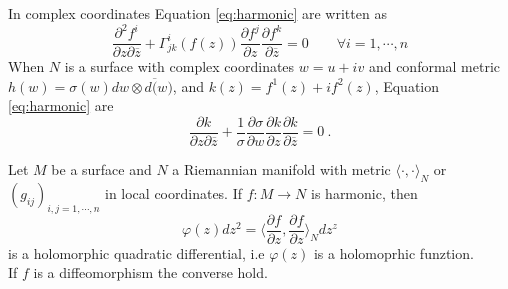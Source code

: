 In complex coordinates Equation \ref{eq:harmonic} are written as
\[
\frac{\partial^2 f^i}{\partial z \partial \overline{z}} + \Gamma^i_{jk} (f(z)) \frac{\partial f^j}{\partial z} \frac{\partial f^k}{\partial \overline{z}} = 0 \qquad \forall i = 1, \cdots, n
\]
When $N$ is a surface with complex coordinates $w = u + iv$ and conformal metric $h(w) = \sigma(w) dw \otimes d\overline(w)$, and $k(z) = f^1(z) + if^2(z)$, Equation \ref{eq:harmonic} are
\begin{equation} \label{eq:harmonic2}
    \frac{\partial k}{ \partial z   \partial \overline{z}} + \frac{1}{\sigma} \frac{\partial \sigma}{ \partial w} \frac{\partial k}{\partial z} \frac{\partial k}{\partial \overline{z}} = 0 \ .
\end{equation}

\begin{theorem}
    Let $M$ be a surface and $N$ a Riemannian manifold with metric $\langle \cdot,\cdot \rangle_N$ or $(g_{ij})_{i,j = 1, \cdots , n}$ in local coordinates. If $f:M \to N$ is harmonic, then 
    \[
        \varphi(z) dz^2 = \Big\langle \frac{\partial f}{\partial z},  \frac{\partial f}{\partial z} \Big\rangle_N dz^z
    \]
    is a holomorphic quadratic differential, i.e $\varphi(z)$ is a holomoprhic funztion. \\
    If $f$ is a diffeomorphism the converse hold.
\end{theorem}
